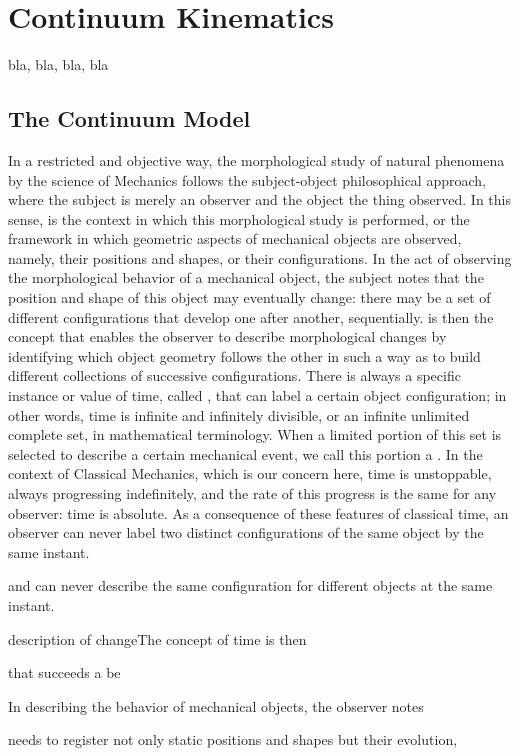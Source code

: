 \chapter{Continuum Kinematics}

bla, bla, bla, bla


\section{The Continuum Model}


In a restricted and objective way, the morphological study of natural phenomena by the science of Mechanics follows the subject-object philosophical approach, where the subject is merely an observer and the object the thing observed. In this sense,  is the context in which this morphological study is performed, or the framework in which geometric aspects of mechanical objects are observed, namely, their positions and shapes, or their configurations. In the act of observing the morphological behavior of a mechanical object, the subject notes that the position and shape of this object may eventually change: there may be a set of different configurations that develop one after another, sequentially.  is then the concept that enables the observer to describe morphological changes by identifying which object geometry follows the other in such a way as to build different collections of successive configurations. There is always a specific instance or value of time, called , that can label a certain object configuration; in other words, time is infinite and infinitely divisible, or an infinite unlimited complete set, in mathematical terminology. When a limited portion of this set is selected to describe a certain mechanical event, we call this portion a . In the context of Classical Mechanics, which is our concern here, time is unstoppable, always progressing indefinitely, and the rate of this progress is the same for any observer: time is absolute. As a consequence of these features of classical time, an observer can never label two distinct configurations of the same object by the same instant. 



and can never describe the same configuration for different objects at the same instant.   


description of changeThe concept of time is then  


 that succeeds a be   


In describing the behavior of mechanical objects, the observer notes 

needs to register not only static positions and shapes but their evolution,  






